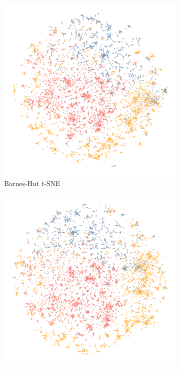 \begin{appendix}
\begin{figure}[tbp]
  \centering
  \begin{subfigure}{0.45\linewidth}
    \centering
    \includegraphics[width=\linewidth]{img/emb/bhtsne_pubmed}
    \caption{Barnes-Hut $t$-SNE}
  \end{subfigure}
\begin{subfigure}{0.45\linewidth}
  \centering
    \includegraphics[width=\linewidth]{img/emb/fitsne_pubmed}

\end{subfigure}
\end{figure}
\end{appendix}
